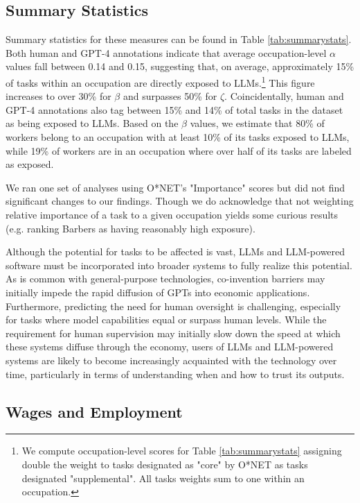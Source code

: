 \documentclass[11pt]{article}
\begin{document}
\subsection{Summary Statistics}

Summary statistics for these measures can be found in Table \ref{tab:summarystats}. Both human and GPT-4 annotations indicate that average occupation-level $\alpha$ values fall between 0.14 and 0.15, suggesting that, on average, approximately 15\% of tasks within an occupation are directly exposed to LLMs.\footnote{We compute occupation-level scores for Table \ref{tab:summarystats} assigning double the weight to tasks designated as "core" by O*NET as tasks designated "supplemental". All tasks weights sum to one within an occupation.} This figure increases to over 30\% for $\beta$ and surpasses 50\% for $\zeta$. Coincidentally, human and GPT-4 annotations also tag between 15\% and 14\% of total tasks in the dataset as being exposed to LLMs. Based on the $\beta$ values, we estimate that 80\% of workers belong to an occupation with at least 10\% of its tasks exposed to LLMs, while 19\% of workers are in an occupation where over half of its tasks are labeled as exposed.

We ran one set of analyses using O*NET's "Importance" scores but did not find significant changes to our findings. Though we do acknowledge that not weighting relative importance of a task to a given occupation yields some curious results (e.g. ranking Barbers as having reasonably high exposure).

Although the potential for tasks to be affected is vast, LLMs and LLM-powered software must be incorporated into broader systems to fully realize this potential. As is common with general-purpose technologies, co-invention barriers may initially impede the rapid diffusion of GPTs into economic applications. Furthermore, predicting the need for human oversight is challenging, especially for tasks where model capabilities equal or surpass human levels. While the requirement for human supervision may initially slow down the speed at which these systems diffuse through the economy, users of LLMs and LLM-powered systems are likely to become increasingly acquainted with the technology over time, particularly in terms of understanding when and how to trust its outputs.




\subsection{Wages and Employment}
\label{subsec:labor}
\end{document}
